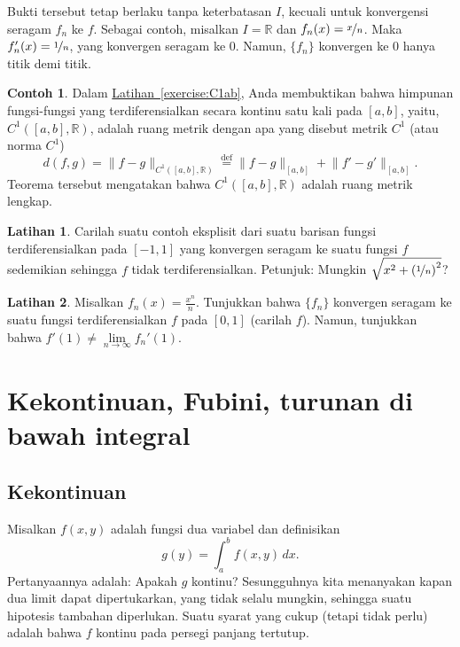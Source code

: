 \documentclass[12pt,openany]{book}
\newcommand{\snorm}[1]{\lVert {#1} \rVert}
\newcommand{\R}{{\mathbb{R}}}
\theoremstyle{plain}
\theoremstyle{remark}
\theoremstyle{definition}
\newenvironment{exbox}{%
    \def\FrameCommand{\vrule width 1pt \relax\hspace{10pt}}%
    \MakeFramed{\advance\hsize-\width\FrameRestore}%
}{%
    \endMakeFramed
}
\theoremstyle{exercise}
\newtheorem{exercise}{Latihan}[section]
\theoremstyle{example}
\newtheorem{example}[thm]{Contoh}
\newcommand{\exerciseref}[1]{\hyperref[#1]{Latihan~\ref*{#1}}}
\begin{document}
Bukti tersebut tetap berlaku tanpa keterbatasan $I$, kecuali untuk
konvergensi seragam $f_n$ ke $f$.  Sebagai contoh, misalkan $I = \R$ dan
$f_n(x) = \nicefrac{x}{n}$.  Maka $f_n'(x)=\nicefrac{1}{n}$, yang
konvergen seragam ke $0$.  Namun, $\{f_n\}$ konvergen ke $0$ hanya titik demi titik.

\begin{example}
Dalam \exerciseref{exercise:C1ab}, Anda membuktikan bahwa
himpunan fungsi-fungsi yang terdiferensialkan secara kontinu satu kali pada $[a,b]$, yaitu,
$C^1([a,b],\R)$, adalah ruang metrik dengan apa yang disebut
metrik $C^1$ (atau norma $C^1$)
\begin{equation*}
d(f,g) =
\snorm{f-g}_{C^1([a,b],\R)}
\overset{\text{def}}{=}
\snorm{f-g}_{[a,b]} + \snorm{f'-g'}_{[a,b]}.
\end{equation*}
Teorema tersebut mengatakan bahwa $C^1([a,b],\R)$ adalah ruang metrik lengkap.
\end{example}

\begin{exbox}
\begin{exercise}
Carilah suatu contoh eksplisit dari suatu barisan
fungsi terdiferensialkan pada $[-1,1]$ yang konvergen seragam ke
suatu fungsi $f$ sedemikian sehingga $f$ tidak terdiferensialkan.
Petunjuk:
Mungkin $\sqrt{x^2+{(\nicefrac{1}{n})}^2}$?
\end{exercise}

\begin{exercise}
Misalkan $f_n(x) = \frac{x^n}{n}$.  Tunjukkan bahwa $\{ f_n \}$ konvergen seragam ke
suatu fungsi terdiferensialkan $f$ pada $[0,1]$ (carilah $f$).  Namun, tunjukkan bahwa
$f'(1) \neq \lim\limits_{n\to\infty} f_n'(1)$.
\end{exercise}
\end{exbox}


\section{Kekontinuan, Fubini, turunan di bawah integral}
\label{sec:contlimitsunderint}

\subsection{Kekontinuan}

Misalkan $f(x,y)$ adalah fungsi dua variabel dan definisikan
\begin{equation*}
g(y) = \int_a^b f(x,y) \,dx .
\end{equation*}
Pertanyaannya adalah: Apakah $g$ kontinu?
Sesungguhnya kita menanyakan kapan dua limit dapat dipertukarkan,
yang tidak selalu mungkin, sehingga suatu hipotesis tambahan
diperlukan.  Suatu syarat yang cukup (tetapi tidak
perlu) adalah bahwa $f$ kontinu pada persegi panjang tertutup.
\end{document}
